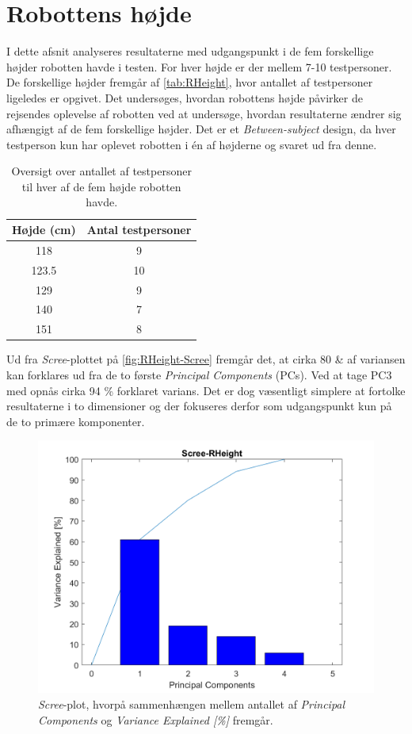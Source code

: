 \section{Robottens højde}
\label{DatabehandlingRHeight}
%
I dette afsnit analyseres resultaterne med udgangspunkt i de fem forskellige højder robotten havde i testen. For hver højde er der mellem 7-10 testpersoner. De forskellige højder fremgår af \autoref{tab:RHeight}, hvor antallet af testpersoner ligeledes er opgivet. Det undersøges, hvordan robottens højde påvirker de rejsendes oplevelse af robotten ved at undersøge, hvordan resultaterne ændrer sig afhængigt af de fem forskellige højder. Det er et \textit{Between-subject} design, da hver testperson kun har oplevet robotten i én af højderne og svaret ud fra denne.
%
\begin{table}[H]
\centering
\begin{tabular}{c|c}
Højde (cm) & Antal testpersoner \\ \hline
118   & 9     \\ \hline
123.5 & 10    \\ \hline
129   & 9     \\ \hline
140   & 7     \\ \hline
151   & 8      \\
\end{tabular}
\caption{Oversigt over antallet af testpersoner til hver af de fem højde robotten havde.}
\label{tab:RHeight}
\end{table}
\noindent
%
Ud fra \textit{Scree}-plottet på \autoref{fig:RHeight-Scree} fremgår det, at cirka 80 \& af variansen kan forklares ud fra de to første \textit{Principal Components} (PCs). Ved at tage PC3 med opnås cirka 94 \% forklaret varians. Det er dog væsentligt simplere at fortolke resultaterne i to dimensioner og der fokuseres derfor som udgangspunkt kun på de to primære komponenter.
%
\begin{figure}[H]
\centering
\includegraphics[width=\textwidth]{Figure/DatabehandlingSkalaer/PCAfigures/RHeight-Scree.png}
\caption{\textit{Scree}-plot, hvorpå sammenhængen mellem antallet af \textit{Principal Components} og \textit{Variance Explained [\%]} fremgår.}
\label{fig:RHeight-Scree}
\end{figure}
